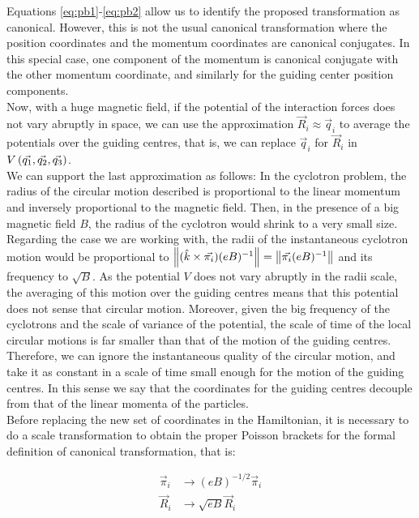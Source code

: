 Equations \eqref{eq:pb1}-\eqref{eq:pb2} allow us to identify the proposed transformation as canonical. However, this is not the usual canonical transformation where the position coordinates and the momentum coordinates are canonical conjugates. In this special case, one component of the momentum is canonical conjugate with the other momentum coordinate, and similarly for the guiding center position components.\\

Now, with a huge magnetic field, if the potential of the interaction forces does not vary abruptly in space, we can use the approximation $\vec{R}_i \approx \vec{q}_i$ to average the potentials over the guiding centres, that is, we can replace $\vec{q}_i$ for $\vec{R}_i$ in  $V \left(  \vec{q_1},\vec{q_2},\vec{q_3}  \right)$.\\

We can support the last approximation as follows: In the cyclotron problem, the radius of the circular motion described is proportional to the linear momentum and inversely proportional to the magnetic field. Then, in the presence of a big magnetic field $B$, the radius of the cyclotron would shrink to a very small size. Regarding the case we are working with, the radii of the instantaneous cyclotron motion would be proportional to $\left\lVert (\hat{k} \times \vec{\pi_i})(eB)^{-1} \right\rVert = \left\lVert \vec{\pi_i}(eB)^{-1} \right\rVert$ and its frequency to $\sqrt{B}$. As the potential $V$ does not vary abruptly in the radii scale, the averaging of this motion over the guiding centres means that this potential does not sense that circular motion. Moreover, given the big frequency of the cyclotrons and the scale of variance of the potential, the scale of time of the local circular motions is far smaller than that of the motion of the guiding centres. Therefore, we can ignore the instantaneous quality of the circular motion, and take it as constant in a scale of time small enough for the motion of the guiding centres. In this sense we say that the coordinates for the guiding centres decouple from that of the linear momenta of the particles.\\

Before replacing the new set of coordinates in the Hamiltonian, it is necessary to do a scale transformation to obtain the proper Poisson brackets for the formal definition of canonical transformation, that is:

\begin{align*}
\vec{\pi}_i & \rightarrow (eB)^{-1/2} \vec{ \pi}_i\\
\vec{R}_i & \rightarrow \sqrt{eB} \vec{R}_i
\end{align*}

